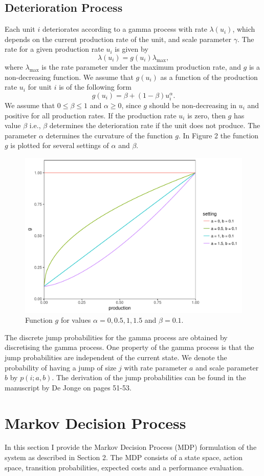 \documentclass[a4paper,12pt]{article}
\begin{document}
\subsection{Deterioration Process}
Each unit $i$ deteriorates according to a gamma process with rate $\lambda(u_i)$, which depends on the current production rate of the unit, and scale parameter $\gamma$. The rate for a given production rate $u_i$ is given by
$$
\lambda(u_i) = g(u_i) \lambda_{\text{max}},
$$
where $\lambda_{\text{max}}$ is the rate parameter under the maximum production rate, and $g$ is a non-decreasing function. We assume that $g(u_i)$ as a function of the production rate $u_i$ for unit $i$ is of the following form
$$
g(u_i) = \beta + (1-\beta)u_i^\alpha.
$$
We assume that $0 \leq \beta \leq 1$ and $\alpha \geq 0$, since $g$ should be non-decreasing in $u_i$ and positive for all production rates. If the production rate $u_i$ is zero, then $g$ has value $\beta$ i.e., $\beta$ determines the deterioration rate if the unit does not produce.  The parameter $\alpha$ determines the curvature of the function $g$. In Figure 2 the function $g$ is plotted for several settings of $\alpha$ and $\beta$. 

\begin{figure}[H]
	\centering
	\includegraphics[width=0.5\linewidth]{figures/g}
	\caption{Function $g$ for values $\alpha = 0, 0.5, 1, 1.5$ and $\beta = 0.1$.}
\end{figure}

The discrete jump probabilities for the gamma process are obtained by discretising the gamma process. One property of the gamma process is that the jump probabilities are independent of the current state. We denote the probability of having a jump of size $j$ with rate parameter $a$ and scale parameter $b$ by $p(i; a, b)$. The derivation of the jump probabilities can be found in the manuscript by De Jonge on pages 51-53.

\section{Markov Decision Process}
In this section I provide the Markov Decision Process (MDP) formulation of the system as described in Section 2. The MDP consists of a state space, action space, transition probabilities, expected costs and a performance evaluation.
\end{document}
